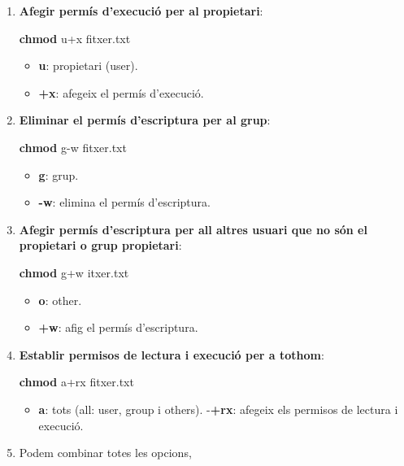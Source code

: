 \documentclass[
  a4paper,
]{article}
\newenvironment{Shaded}{\begin{snugshade}}{\end{snugshade}}
\newcommand{\FunctionTok}[1]{\textcolor[rgb]{0.13,0.29,0.53}{\textbf{#1}}}
\newcommand{\NormalTok}[1]{#1}
\providecommand{\tightlist}{%
  \setlength{\itemsep}{0pt}\setlength{\parskip}{0pt}}
\begin{document}
\begin{enumerate}
\def\labelenumi{\arabic{enumi}.}
\item
  \textbf{Afegir permís d'execució per al propietari}:

\begin{Shaded}
\begin{Highlighting}[]
\FunctionTok{chmod}\NormalTok{ u+x fitxer.txt}
\end{Highlighting}
\end{Shaded}

  \begin{itemize}
  \tightlist
  \item
    \textbf{u}: propietari (user).
  \item
    \textbf{+x}: afegeix el permís d'execució.
  \end{itemize}
\item
  \textbf{Eliminar el permís d'escriptura per al grup}:

\begin{Shaded}
\begin{Highlighting}[]
\FunctionTok{chmod}\NormalTok{ g{-}w fitxer.txt}
\end{Highlighting}
\end{Shaded}

  \begin{itemize}
  \tightlist
  \item
    \textbf{g}: grup.
  \item
    \textbf{-w}: elimina el permís d'escriptura.
  \end{itemize}
\item
  \textbf{Afegir permís d'escriptura per all altres usuari que no són el
  propietari o grup propietari}:

\begin{Shaded}
\begin{Highlighting}[]
\FunctionTok{chmod}\NormalTok{ g+w itxer.txt}
\end{Highlighting}
\end{Shaded}

  \begin{itemize}
  \tightlist
  \item
    \textbf{o}: other.
  \item
    \textbf{+w}: afig el permís d'escriptura.
  \end{itemize}
\item
  \textbf{Establir permisos de lectura i execució per a tothom}:

\begin{Shaded}
\begin{Highlighting}[]
\FunctionTok{chmod}\NormalTok{ a+rx fitxer.txt}
\end{Highlighting}
\end{Shaded}

  \begin{itemize}
  \tightlist
  \item
    \textbf{a}: tots (all: user, group i others). -\textbf{+rx}: afegeix
    els permisos de lectura i execució.
  \end{itemize}
\item
  Podem combinar totes les opcions,
\end{enumerate}
\end{document}
